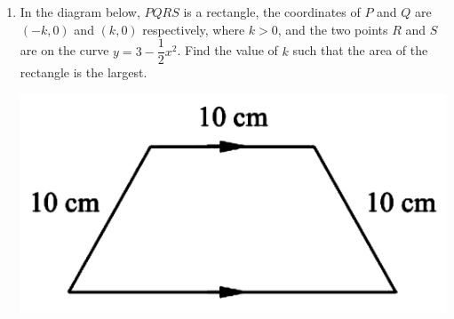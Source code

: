 \begin{enumerate}
\begin{center}
          \end{center}
    \item In the diagram below, $PQRS$ is a rectangle, the coordinates of $P$ and $Q$ are
          $(-k, 0)$ and $(k, 0)$ respectively, where $k > 0$, and the two points $R$ and
          $S$ are on the curve $y = 3- \dfrac{1}{2}x^2$. Find the value of $k$ such that
          the area of the rectangle is the largest.
          \begin{center}
              \includegraphics[scale=0.25]{assets/26-11.png}
          \end{center}
\end{enumerate}